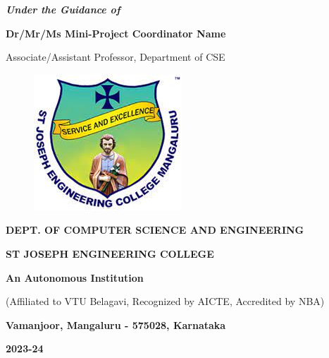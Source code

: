 \documentclass[12pt,a4paper]{report}
\begin{document}
\begin{center}
\vspace{12pt}
\textit{\textbf{Under the Guidance of}}
\par
\vspace{6pt}
\textbf{Dr/Mr/Ms Mini-Project Coordinator Name }
\par
\vspace{2pt}
\normalsize { Associate/Assistant Professor, Department of CSE }
\par
\begin{figure}[hbtp]
\centering
\includegraphics[scale=0.6]{./pic/sjeclogo}
\end{figure}
\large \textbf{DEPT. OF COMPUTER SCIENCE AND ENGINEERING}
\par \Large \textbf{ST JOSEPH ENGINEERING COLLEGE}
\par 
\textbf{An Autonomous Institution}
\par
{\large{(Affiliated to VTU Belagavi, Recognized by AICTE, Accredited by NBA)}}
\par
{\large \textbf{Vamanjoor, Mangaluru - 575028, Karnataka}}
\par 
{\Large \textbf{2023-24}}
\end{center}
\newpage
\end{document}
